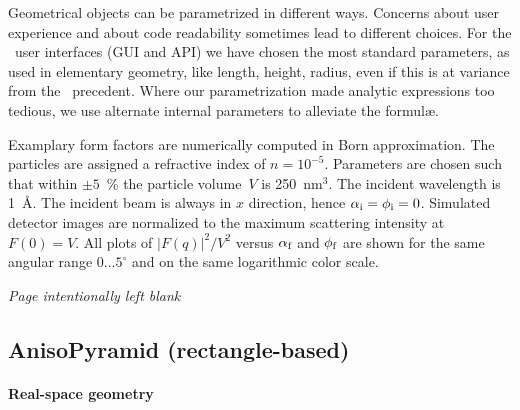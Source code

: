 Geometrical objects can be parametrized in different ways.
Concerns about user experience and about code readability
sometimes lead to different choices.
For the \BornAgain\ user interfaces (GUI and API)
we have chosen the most standard parameters,
as used in elementary geometry, like length, height, radius,
even if this is at variance from the \IsGISAXS\ precedent.
Where our parametrization made analytic expressions too tedious,
we use alternate internal parameters to alleviate the formul\ae.

Examplary form factors are numerically computed in Born approximation.
The particles are assigned a refractive index of $n=10^{-5}$.
Parameters are chosen such that within $\pm5$~\%
the particle volume~$V$ is 250~nm$^3$.
The incident wavelength is 1~\AA.
The incident beam is always in $x$ direction, hence $\alpha_{\text{i}}=\phi_{\text{i}}=0$.
Simulated detector images are normalized to the maximum scattering intensity at $F(0)=V$.
All plots of $|F(q)|^2/V^2$ versus $\alpha_{\text{f}}$ and $\phi_{\text{f}}$
are shown for the same angular range $0\ldots5^\circ$
and on the same logarithmic color scale.

\ifodd\value{page}\else\FloatBarrier\newpage\textit{Page intentionally left blank}\fi

\FloatBarrier\newpage
\subsection{AnisoPyramid (rectangle-based)} \label{sec:AnisoPyramid} 

\paragraph{Real-space geometry}\strut\\

